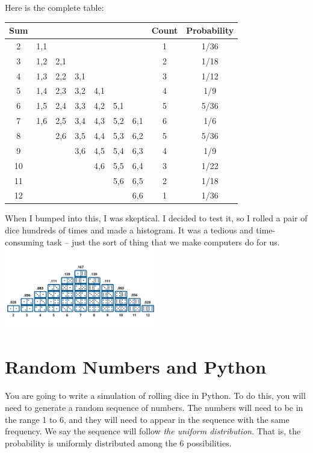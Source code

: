 Here is the complete table:
\begin{tabular}{c| c c c c c c | c | c}
  Sum &     &     &     &     &     &     & Count & Probability \\
  \hline
  2   & 1,1 &     &     &     &     &     &   1    & 1/36 \\
  3   & 1,2 & 2,1 &     &     &     &     &   2    & 1/18 \\
  4   & 1,3 & 2,2 & 3,1 &     &     &     &   3    & 1/12 \\
  5   & 1,4 & 2,3 & 3,2 & 4,1 &     &     &   4    & 1/9 \\
  6   & 1,5 & 2,4 & 3,3 & 4,2 & 5,1 &     &   5    & 5/36 \\
  7   & 1,6 & 2,5 & 3,4 & 4,3 & 5,2 & 6,1 &   6    & 1/6 \\
  8   &     & 2,6 & 3,5 & 4,4 & 5,3 & 6,2 &   5    & 5/36 \\
  9   &     &     & 3,6 & 4,5 & 5,4 & 6,3 &   4    & 1/9 \\
  10  &     &     &     & 4,6 & 5,5 & 6,4 &   3    & 1/22 \\
  11  &     &     &     &     & 5,6 & 6,5 &   2    & 1/18 \\
  12  &     &     &     &     &     & 6,6 &   1    & 1/36
\end{tabular}

When I bumped into this, I was skeptical. I decided to test it, so I
rolled a pair of dice hundreds of times and made a histogram. It was a
tedious and time-consuming task -- just the sort of thing that we make
computers do for us.
\includegraphics[width=0.5\textwidth]{dice_histogram.png}
\section{Random Numbers and Python}

You are going to write a simulation of rolling dice in Python. To do
this, you will need to generate a random sequence of numbers. The
numbers will need to be in the range 1 to 6, and they will need to
appear in the sequence with the same frequency.  We say the sequence
will follow \textit{the uniform distribution}.  That is, the
probability is uniformly distributed among the 6 possibilities.

